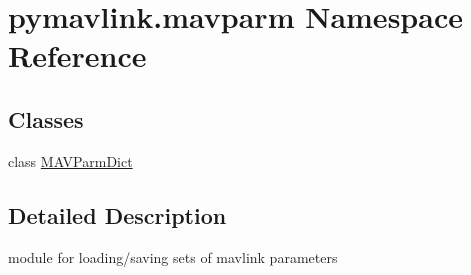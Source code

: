 \hypertarget{namespacepymavlink_1_1mavparm}{}\section{pymavlink.\+mavparm Namespace Reference}
\label{namespacepymavlink_1_1mavparm}
\subsection*{Classes}
\begin{DoxyCompactItemize}
\item 
class \hyperlink{classpymavlink_1_1mavparm_1_1MAVParmDict}{M\+A\+V\+Parm\+Dict}
\end{DoxyCompactItemize}


\subsection{Detailed Description}
\begin{DoxyVerb}module for loading/saving sets of mavlink parameters
\end{DoxyVerb}
 